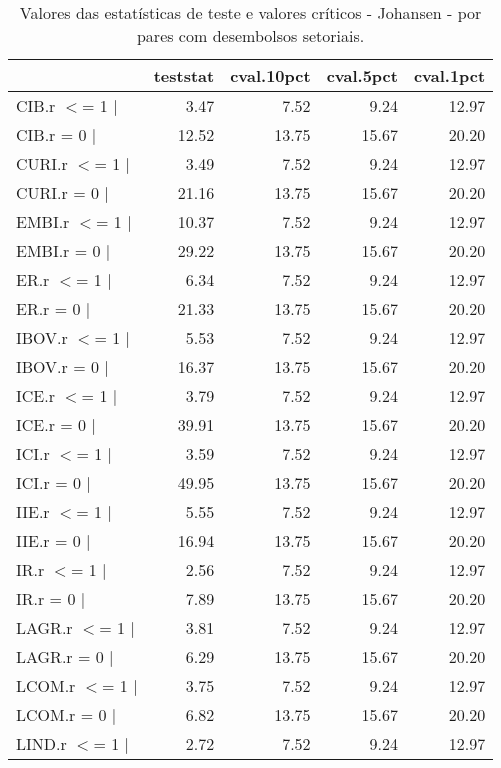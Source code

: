 \begin{table}[!htb]
\centering
\caption{Valores das estat\'{i}sticas de teste e valores cr\'{i}ticos - Johansen - por pares com desembolsos setoriais.} 
\label{tab:cointegration-by2-2}
\begin{tabular}{lrrrr}
  \toprule
 & teststat & cval.10pct & cval.5pct & cval.1pct \\ 
  \midrule
CIB.r $<$= 1 $|$ & 3.47 & 7.52 & 9.24 & 12.97 \\ 
  CIB.r = 0  $|$ & 12.52 & 13.75 & 15.67 & 20.20 \\ 
  CURI.r $<$= 1 $|$ & 3.49 & 7.52 & 9.24 & 12.97 \\ 
  CURI.r = 0  $|$ & 21.16 & 13.75 & 15.67 & 20.20 \\ 
  EMBI.r $<$= 1 $|$ & 10.37 & 7.52 & 9.24 & 12.97 \\ 
  EMBI.r = 0  $|$ & 29.22 & 13.75 & 15.67 & 20.20 \\ 
  ER.r $<$= 1 $|$ & 6.34 & 7.52 & 9.24 & 12.97 \\ 
  ER.r = 0  $|$ & 21.33 & 13.75 & 15.67 & 20.20 \\ 
  IBOV.r $<$= 1 $|$ & 5.53 & 7.52 & 9.24 & 12.97 \\ 
  IBOV.r = 0  $|$ & 16.37 & 13.75 & 15.67 & 20.20 \\ 
  ICE.r $<$= 1 $|$ & 3.79 & 7.52 & 9.24 & 12.97 \\ 
  ICE.r = 0  $|$ & 39.91 & 13.75 & 15.67 & 20.20 \\ 
  ICI.r $<$= 1 $|$ & 3.59 & 7.52 & 9.24 & 12.97 \\ 
  ICI.r = 0  $|$ & 49.95 & 13.75 & 15.67 & 20.20 \\ 
  IIE.r $<$= 1 $|$ & 5.55 & 7.52 & 9.24 & 12.97 \\ 
  IIE.r = 0  $|$ & 16.94 & 13.75 & 15.67 & 20.20 \\ 
  IR.r $<$= 1 $|$ & 2.56 & 7.52 & 9.24 & 12.97 \\ 
  IR.r = 0  $|$ & 7.89 & 13.75 & 15.67 & 20.20 \\ 
  LAGR.r $<$= 1 $|$ & 3.81 & 7.52 & 9.24 & 12.97 \\ 
  LAGR.r = 0  $|$ & 6.29 & 13.75 & 15.67 & 20.20 \\ 
  LCOM.r $<$= 1 $|$ & 3.75 & 7.52 & 9.24 & 12.97 \\ 
  LCOM.r = 0  $|$ & 6.82 & 13.75 & 15.67 & 20.20 \\ 
  LIND.r $<$= 1 $|$ & 2.72 & 7.52 & 9.24 & 12.97 \\ 

\end{tabular}
\end{table}

